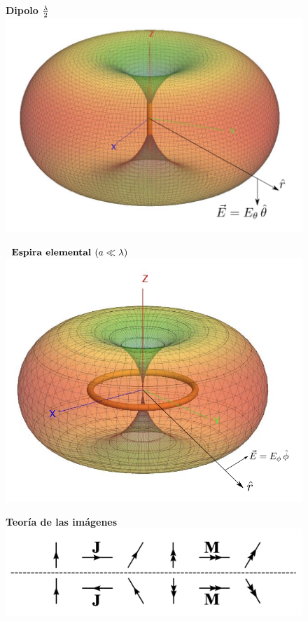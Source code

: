 \documentclass[twocolumn, 8pt]{extarticle}
\begin{document}
\begin{multicols}{2}
	\begin{figure}[H]
		\centering
		\textbf{Dipolo }\( \frac{\lambda}{2} \vspace{0.5cm} \)
		\includegraphics[width=\columnwidth]{diagrama_dipolo.png}
	\end{figure}

	\begin{figure}[H]
		\centering
		\(\textbf{ Espira elemental } \newline (a \ll \lambda) \)
		\includegraphics[width=\columnwidth]{espira_elemental.png}
	\end{figure}
\end{multicols}

\begin{figure}[H]
	\centering
	\textbf{Teoría de las imágenes}
	\includegraphics[width=\columnwidth]{teoria_imagenes.png}
\end{figure}
\end{document}
